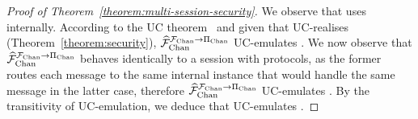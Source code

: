 \begin{proof}[Proof of Theorem~\ref{theorem:multi-session-security}]
  We observe that \fchanhat uses \fchan internally. According to the UC
  theorem~\cite{uc} and given that \pchan UC-realises \fchan
  (Theorem~\ref{theorem:security}), $\widehat{\mathcal{F}}_{\mathrm{Chan}}^{\mathcal{F}_{\mathrm{Chan}} \rightarrow \Pi_{\mathrm{Chan}}}$
  UC-emulates \fchanhat. We now observe that $\widehat{\mathcal{F}}_{\mathrm{Chan}}^{\mathcal{F}_{\mathrm{Chan}} \rightarrow
  \Pi_{\mathrm{Chan}}}$ behaves identically to a session with \pchanhat protocols, as the
  former routes each message to the same internal \pchan instance that would
  handle the same message in the latter case, therefore $\widehat{\mathcal{F}}_{\mathrm{Chan}}^{\mathcal{F}_{\mathrm{Chan}}
  \rightarrow \Pi_{\mathrm{Chan}}}$ UC-emulates \pchanhat. By the transitivity of
  UC-emulation, we deduce that \fchanhat UC-emulates \pchanhat.
\end{proof}

